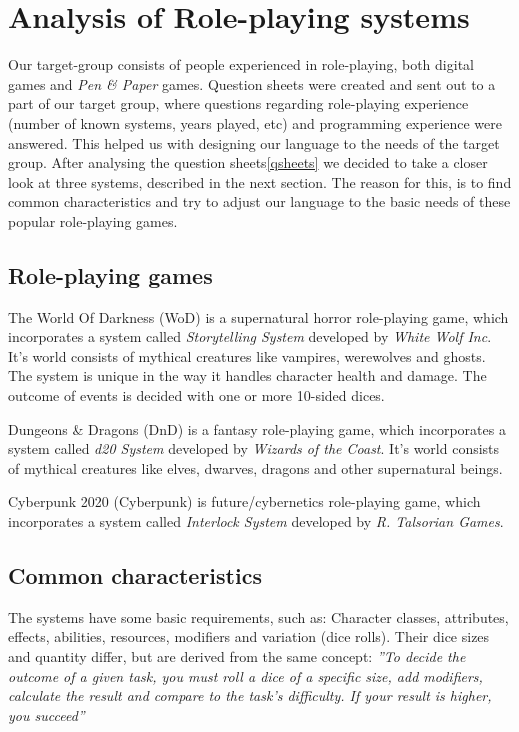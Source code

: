 \section{Analysis of Role-playing systems}
Our target-group consists of people experienced in role-playing, both digital games and \emph{Pen \& Paper} games. Question sheets were created and sent out to a part of our target group, where questions regarding role-playing experience (number of known systems, years played, etc) and programming experience were answered. This helped us with designing our language to the needs of the target group.
After analysing the question sheets\vref{qsheets} we decided to take a closer look at three systems, described in the next section. The reason for this, is to find common characteristics and try to adjust our language to the basic needs of these popular role-playing games.

\subsection*{Role-playing games}

The World Of Darkness (WoD) is a supernatural horror role-playing game, which incorporates a system called \emph{Storytelling System} developed by \emph{White Wolf Inc}. It's world consists of mythical creatures like vampires, werewolves and ghosts. The system is unique in the way it handles character health and damage. The outcome of events is decided with one or more 10-sided dices.\cite{wod}

Dungeons \& Dragons (DnD) is a fantasy role-playing game, which incorporates a system called \emph{d20 System} developed by \emph{Wizards of the Coast}.
It's world consists of mythical creatures like elves, dwarves, dragons and other supernatural beings.\cite{dnd}

Cyberpunk 2020 (Cyberpunk) is future/cybernetics role-playing game, which incorporates a system called \emph{Interlock System} developed by \emph{R. Talsorian Games}.\cite{cyberpunk}

\subsection*{Common characteristics}
\label{baseclasses}
The systems have some basic requirements, such as:
Character classes, attributes, effects, abilities, resources, modifiers and variation (dice rolls).
Their dice sizes and quantity differ, but are derived from the same concept: \textit{''To decide the outcome of a given task, you must roll a dice of a specific size, add modifiers, calculate the result and compare to the task's difficulty. If your result is higher, you succeed''}\\

